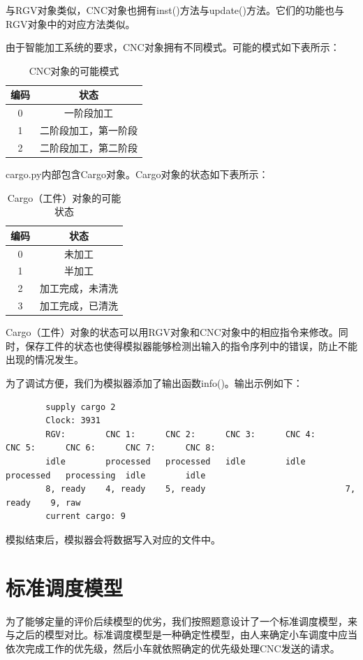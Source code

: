 \documentclass{cumcmthesis}
\begin{document}
	与RGV对象类似，CNC对象也拥有inst()方法与update()方法。它们的功能也与RGV对象中的对应方法类似。
	
	由于智能加工系统的要求，CNC对象拥有不同模式。可能的模式如下表所示：
	\begin{table}[!htbp]
		\centering
		\begin{tabular}{c|c}
			\toprule[1.5pt]
			编码 & 状态 \\
			\midrule[1.5pt]
			0 & 一阶段加工 \\
			1 & 二阶段加工，第一阶段\\
			2 & 二阶段加工，第二阶段\\
			\bottomrule[1.5pt]
		\end{tabular}
		\caption{CNC对象的可能模式}
	\end{table}
	
	cargo.py内部包含Cargo对象。Cargo对象的状态如下表所示：
	\begin{table}[!htbp]
		\centering
		\begin{tabular}{c|c}
			\toprule[1.5pt]
			编码 & 状态 \\
			\midrule[1.5pt]
			0 & 未加工 \\
			1 & 半加工\\
			2 & 加工完成，未清洗\\
			3 & 加工完成，已清洗\\
			\bottomrule[1.5pt]
		\end{tabular}
		\caption{Cargo（工件）对象的可能状态}
	\end{table}
	Cargo（工件）对象的状态可以用RGV对象和CNC对象中的相应指令来修改。同时，保存工件的状态也使得模拟器能够检测出输入的指令序列中的错误，防止不能出现的情况发生。
	
	为了调试方便，我们为模拟器添加了输出函数info()。输出示例如下：
	
	\begin{lstlisting}
		supply cargo 2
		Clock: 3931
		RGV:        CNC 1:      CNC 2:      CNC 3:      CNC 4:      CNC 5:      CNC 6:      CNC 7:      CNC 8:
		idle        processed   processed   idle        idle        processed   processing  idle        idle
		8, ready    4, ready    5, ready                            7, ready    9, raw
		current cargo: 9
	\end{lstlisting}
	
	模拟结束后，模拟器会将数据写入对应的文件中。
	
	\section{标准调度模型}
	为了能够定量的评价后续模型的优劣，我们按照题意设计了一个标准调度模型，来与之后的模型对比。标准调度模型是一种确定性模型，由人来确定小车调度中应当依次完成工作的优先级，然后小车就依照确定的优先级处理CNC发送的请求。
\end{document}
